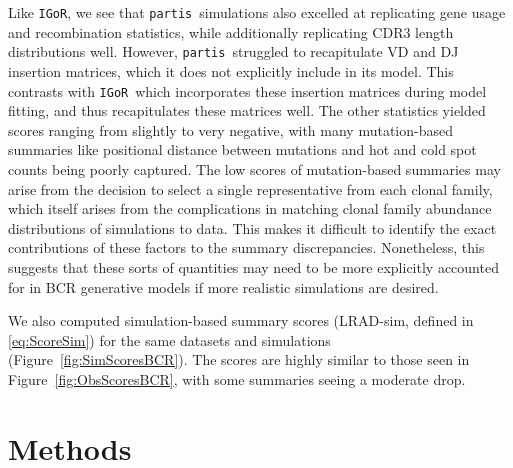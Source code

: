 \documentclass{article}
\newcommand{\partis}{\texttt{partis}}
\newcommand{\igor}{\texttt{IGoR}}
\begin{document}
Like \igor, we see that \partis\ simulations also excelled at replicating gene usage and recombination statistics, while additionally replicating CDR3 length distributions well.
However, \partis\ struggled to recapitulate VD and DJ insertion matrices, which it does not explicitly include in its model.
This contrasts with \igor\ which incorporates these insertion matrices during model fitting, and thus recapitulates these matrices well.
The other statistics yielded scores ranging from slightly to very negative, with many mutation-based summaries like positional distance between mutations and hot and cold spot counts being poorly captured.
The low scores of mutation-based summaries may arise from the decision to select a single representative from each clonal family, which itself arises from the complications in matching clonal family abundance distributions of simulations to data.
This makes it difficult to identify the exact contributions of these factors to the summary discrepancies.
Nonetheless, this suggests that these sorts of quantities may need to be more explicitly accounted for in BCR generative models if more realistic simulations are desired.

We also computed simulation-based summary scores (LRAD-sim, defined in \eqref{eq:ScoreSim}) for the same datasets and simulations (Figure~\ref{fig:SimScoresBCR}).
The scores are highly similar to those seen in Figure~\ref{fig:ObsScoresBCR}, with some summaries seeing a moderate drop.


\section*{Methods}
\end{document}
